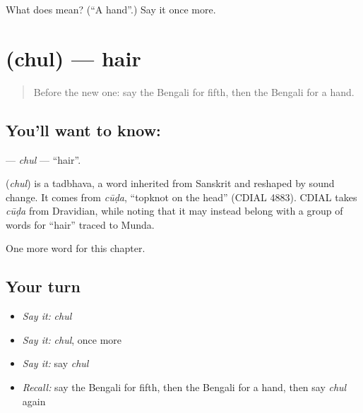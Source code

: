 \begin{tcolorbox}[breakable,colback=teal!4,colframe=teal!35!black,title={Before you move on}]
What does  mean? (\textquotedblleft{}A hand\textquotedblright{}.) Say it once more.
\end{tcolorbox}
\section[\texorpdfstring{\bn{চুল} (chul)}{চুল (chul)}]{ (chul) — hair}

\label{lesson:BN-C42-chul}



\begin{quote}
Before the new one: say the Bengali for fifth, then the Bengali for a hand.
\end{quote}

\subsection*{You'll want to know: }
\textbf{} — \emph{chul} — \textquotedblleft{}hair\textquotedblright{}.

\begin{cousinweb}
\textbf{} (\emph{chul}) is a tadbhava, a word inherited from Sanskrit and reshaped by sound change. It comes from \emph{cūḍa}, \textquotedblleft{}topknot on the head\textquotedblright{} (CDIAL 4883). CDIAL takes \emph{cūḍa} from Dravidian, while noting that it may instead belong with a group of words for \textquotedblleft{}hair\textquotedblright{} traced to Munda.
\end{cousinweb}

\begin{grammarlens}[title={What you've built}]
One more word for this chapter.
\end{grammarlens}

\subsection*{Your turn}
\begin{itemize}
\raggedright
  \item \emph{Say it:} \emph{chul}
  \item \emph{Say it:} \emph{chul}, once more
  \item \emph{Say it:} say \emph{chul}
  \item \emph{Recall:} say the Bengali for fifth, then the Bengali for a hand, then say \emph{chul} again
\end{itemize}

